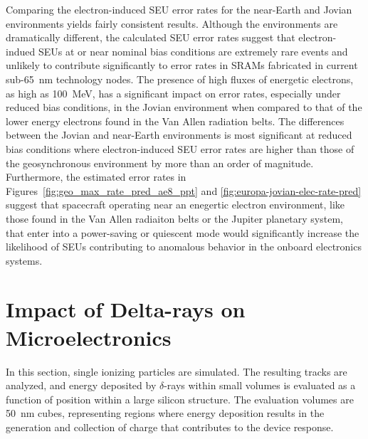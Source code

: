 Comparing the electron-induced SEU error rates for the near-Earth and Jovian environments yields fairly consistent results.
Although the environments are dramatically different, the calculated SEU error rates suggest that electron-indued SEUs at or near nominal bias conditions are extremely rare events and unlikely to contribute significantly to error rates in SRAMs fabricated in current sub-65~nm technology nodes.
The presence of high fluxes of energetic electrons, as high as 100~MeV, has a significant impact on error rates, especially under reduced bias conditions, in the Jovian environment when compared to that of the lower energy electrons found in the Van Allen radiation belts.
The differences between the Jovian and near-Earth environments is most significant at reduced bias conditions where electron-induced SEU error rates are higher than those of the geosynchronous environment by more than an order of magnitude.
Furthermore, the estimated error rates in Figures~\ref{fig:geo_max_rate_pred_ae8_ppt} and \ref{fig:europa-jovian-elec-rate-pred} suggest that spacecraft operating near an enegertic electron environment, like those found in the Van Allen radiaiton belts or the Jupiter planetary system, that enter into a power-saving or quiescent mode would significantly increase the likelihood of SEUs contributing to anomalous behavior in the onboard electronics systems.

\section{Impact of Delta-rays on Microelectronics} %
\label{sec:impact_of_delta_rays_on_microelectronics}
In this section, single ionizing particles are simulated.
The resulting tracks are analyzed, and energy deposited by $\delta$-rays within small volumes is evaluated as a function of position within a large silicon structure.
The evaluation volumes are 50~nm cubes, representing regions where energy deposition results in the generation and collection of charge that contributes to the device response.

